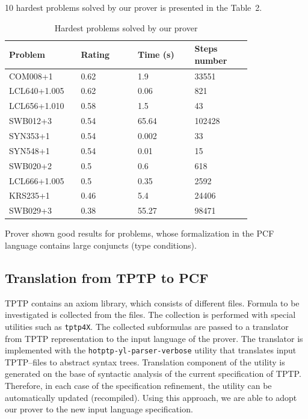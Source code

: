 \documentclass[runningheads,a4paper]{llncs}
\begin{document}
10 hardest problems solved by our prover is presented in the Table~2.
\begin{table}
\caption{Hardest problems solved by our prover}
\begin{tabular}{|p{0.2\linewidth}|p{0.2\linewidth}|p{0.2\linewidth}|p{0.2\linewidth}|}

\hline
\textbf{Problem} & \textbf{Rating} & \textbf{Time (s)} & \textbf{Steps number} \\
\hline
COM008+1 & 0.62 & 1.9 & 33551 \\
\hline
LCL640+1.005 &  0.62 &  0.06 &  821 \\
\hline
LCL656+1.010 &  0.58 &  1.5 &  43 \\
\hline
SWB012+3 &  0.54 &  65.64 &  102428 \\
\hline
SYN353+1 &  0.54 &  0.002 &  33 \\
\hline
SYN548+1 &  0.54 &  0.01 &  15 \\
\hline
SWB020+2 &  0.5 &  0.6 &  618 \\
\hline
LCL666+1.005 &  0.5 &  0.35 &  2592 \\
\hline
KRS235+1 & 0.46 & 5.4 & 24406 \\
\hline
SWB029+3 &  0.38 &  55.27 &  98471 \\
\hline
\end{tabular}
\end{table}


Prover shown good results for problems, whose formalization in the PCF language contains large conjuncts (type conditions).

\subsection{Translation from TPTP to PCF}
TPTP contains an axiom library, which consists of different files. Formula to be investigated is collected from the files. The collection is performed with special utilities such as \texttt{tptp4X}. The collected subformulas are passed to a translator from TPTP representation to the input language of the prover. The translator is implemented with the \texttt{hotptp-yl-parser-verbose} \cite{TPTPTrans} utility that translates input TPTP--files to abstract syntax trees. Translation component of the utility is generated on the base of syntactic analysis of the current specification of TPTP. Therefore, in each case of the specification refinement, the utility can be automatically updated (recompiled). Using this approach, we are able to adopt our prover to the new input language specification.
\end{document}
